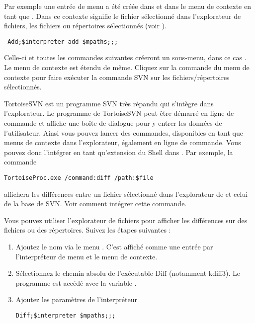 Par exemple une entrée de menu a été créée dans  et dans le menu de contexte en tant que . Dans ce contexte  signifie le fichier sélectionné dans l'explorateur de fichiers,  les fichiers ou répertoires sélectionnés (voir ).

\begin{lstlisting}
 Add;$interpreter add $mpaths;;;
\end{lstlisting}

Celle-ci et toutes les commandes suivantes créeront un sous-menu, dans ce cas . Le menu de contexte est étendu de même. Cliquez sur la commande du menu de contexte pour faire exécuter la commande SVN  sur les fichiers/répertoires sélectionnés.

TortoiseSVN est un programme SVN très répandu qui s'intègre dans l'explorateur. Le programme  de TortoiseSVN peut être démarré en ligne de commande et affiche une boîte de dialogue pour y entrer les données de l'utilisateur. Ainsi vous pouvez lancer des commandes, disponibles en tant que menus de contexte dans l'explorateur, également en ligne de commande. Vous pouvez donc l'intégrer en tant qu'extension du Shell dans  \codeblocks. Par exemple, la commande

\begin{lstlisting}
TortoiseProc.exe /command:diff /path:$file
\end{lstlisting}

affichera les différences entre un fichier sélectionné dans l'explorateur de \codeblocks et celui de la base de SVN. Voir  comment intégrer cette commande.



Vous pouvez utiliser l'explorateur de fichiers pour afficher les différences sur des fichiers ou des répertoires. Suivez les étapes suivantes :

\begin{enumerate}
\item Ajoutez le nom via le menu . C'est affiché comme une entrée par l'interpréteur de menu et le menu de contexte.
\item Sélectionnez le chemin absolu de l'exécutable Diff (notamment kdiff3). Le programme est accédé avec la variable .
\item Ajoutez les paramètres de l'interpréteur
\begin{lstlisting}
Diff;$interpreter $mpaths;;;
\end{lstlisting}
\end{enumerate}

